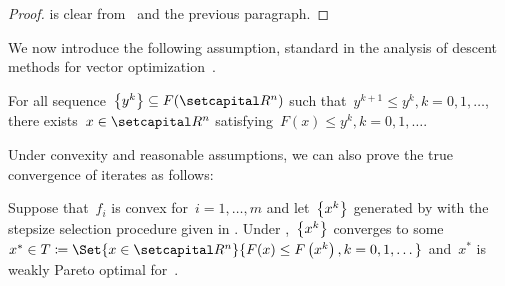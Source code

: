 \documentclass[../main]{subfiles}
\begin{document}
\begin{proof}
     is clear from~ and the previous paragraph.
\end{proof}

We now introduce the following assumption, standard in the analysis of descent methods for vector optimization~\cite{Fliege2000,Grana-Drummond2004,Fukuda2011}.
\begin{assumption} 
    For all sequence~$\set*{y^k} \subseteq F(\setR^n)$ such that~$y^{k + 1} \le y^k, k = 0, 1, \dots$, there exists~$x \in \setR^n$ satisfying~$F(x) \le y^k, k = 0, 1, \dots$.
\end{assumption}
Under convexity and reasonable assumptions, we can also prove the true convergence of iterates as follows:
\begin{theorem} 
    Suppose that~$f_i$ is convex for~$i = 1, \dots, m$ and let~$\set*{x^k}$ generated by  with the stepsize selection procedure given in .
    Under ,~$\set*{x^k}$ converges to some~$x^* \in T \coloneqq \Set{x \in \setR^n}{F(x) \le F\left(x^k\right), k = 0, 1, \dots}$ and~$x^*$ is weakly Pareto optimal for~.
\end{theorem}
\end{document}
